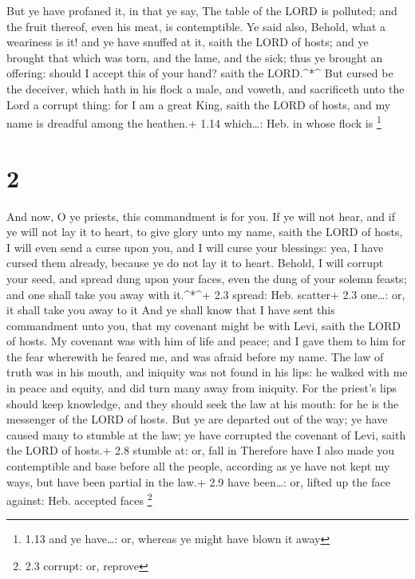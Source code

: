  But ye have profaned it, in that ye say, The table of the
LORD is polluted; and the fruit thereof, even his meat, is contemptible.
 Ye said also, Behold, what a weariness is it! and ye have
snuffed at it, saith the LORD of hosts; and ye brought that which was
torn, and the lame, and the sick; thus ye brought an offering: should I
accept this of your hand? saith the LORD.\^{}*\^{}  But
cursed be the deceiver, which hath in his flock a male, and voweth, and
sacrificeth unto the Lord a corrupt thing: for I am a great King, saith
the LORD of hosts, and my name is dreadful among the heathen.+ 1.14
which\ldots: Heb. in whose flock is \footnote{1.13 and ye have\ldots:
  or, whereas ye might have blown it away}

\hypertarget{section-1}{%
\section{2}\label{section-1}}

 And now, O ye priests, this commandment is for you.
 If ye will not hear, and if ye will not lay it to heart, to
give glory unto my name, saith the LORD of hosts, I will even send a
curse upon you, and I will curse your blessings: yea, I have cursed them
already, because ye do not lay it to heart.  Behold, I will
corrupt your seed, and spread dung upon your faces, even the dung of
your solemn feasts; and one shall take you away with it.\^{}*\^{}+ 2.3
spread: Heb. scatter+ 2.3 one\ldots: or, it shall take you away to it
 And ye shall know that I have sent this commandment unto
you, that my covenant might be with Levi, saith the LORD of hosts.
 My covenant was with him of life and peace; and I gave them
to him for the fear wherewith he feared me, and was afraid before my
name.  The law of truth was in his mouth, and iniquity was
not found in his lips: he walked with me in peace and equity, and did
turn many away from iniquity.  For the priest's lips should
keep knowledge, and they should seek the law at his mouth: for he is the
messenger of the LORD of hosts.  But ye are departed out of
the way; ye have caused many to stumble at the law; ye have corrupted
the covenant of Levi, saith the LORD of hosts.+ 2.8 stumble at: or, fall
in  Therefore have I also made you contemptible and base
before all the people, according as ye have not kept my ways, but have
been partial in the law.+ 2.9 have been\ldots: or, lifted up the face
against: Heb. accepted faces \footnote{2.3 corrupt: or, reprove}

